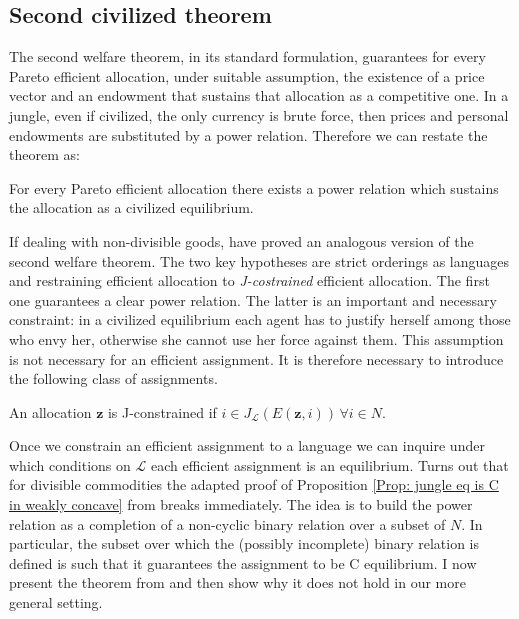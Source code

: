 \subsection{Second civilized theorem}

The second welfare theorem, in its standard formulation, guarantees for every Pareto efficient allocation, under suitable assumption, the existence of a price vector and an endowment that sustains that allocation as a competitive one. In a jungle, even if civilized, the only currency is brute force, then prices and personal endowments are substituted by a power relation. Therefore we can restate the theorem as:

\begin{center}
    For every Pareto efficient allocation there exists a power relation which sustains the allocation as a civilized equilibrium. 
\end{center}

If dealing with non-divisible goods, \cite[RY]{RY} have proved an analogous version of the second welfare theorem. The two key hypotheses are strict orderings as languages and restraining efficient allocation to \textit{J-costrained} efficient allocation. The first one guarantees a clear power relation. The latter is an important and necessary constraint: in a civilized equilibrium each agent has to justify herself among those who envy her, otherwise she cannot use her force against them. This assumption is not necessary for an efficient assignment. It is therefore necessary to introduce the following class of assignments.

\begin{definition}
    An allocation $\textbf{z}$ is J-constrained if $i\in J_{\mathcal{L}}(E(\textbf{z},i))\,\forall i \in N$.
\end{definition}

Once we constrain an efficient assignment to a language we can inquire under which conditions on $\mathcal{L}$ each efficient assignment is an equilibrium. Turns out that for divisible commodities the adapted proof of Proposition \ref{Prop: jungle eq is C in weakly concave} from \cite[RY]{RY} breaks immediately. The idea is to build the power relation as a completion of a non-cyclic binary relation over a subset of $N$. In particular, the subset over which the (possibly incomplete) binary relation is defined is such that it guarantees the assignment to be C equilibrium. I now present the theorem from \cite[RY]{RY} and then show why it does not hold in our more general setting.

